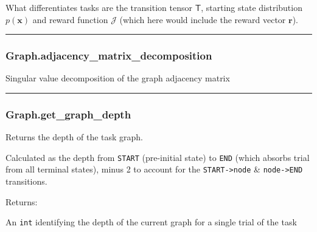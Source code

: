 What differentiates tasks are the transition tensor \(\mathsf T\),
starting state distribution \(p(\mathbf x)\) and reward function
\(\mathcal J\) (which here would include the reward vector
\(\mathbf r\)).

\begin{center}\rule{0.5\linewidth}{\linethickness}\end{center}

\hypertarget{graph.adjacency_matrix_decomposition}{%
\subsubsection{Graph.adjacency\_matrix\_decomposition}\label{graph.adjacency_matrix_decomposition}}

\begin{Shaded}
\begin{Highlighting}[]
\NormalTok{)}
\end{Highlighting}
\end{Shaded}

Singular value decomposition of the graph adjacency matrix

\begin{center}\rule{0.5\linewidth}{\linethickness}\end{center}

\hypertarget{graph.get_graph_depth}{%
\subsubsection{Graph.get\_graph\_depth}\label{graph.get_graph_depth}}

\begin{Shaded}
\begin{Highlighting}[]
\NormalTok{)}
\end{Highlighting}
\end{Shaded}

Returns the depth of the task graph.

Calculated as the depth from \texttt{START} (pre-initial state) to
\texttt{END} (which absorbs trial from all terminal states), minus 2 to
account for the \texttt{START-\textgreater{}node} \&
\texttt{node-\textgreater{}END} transitions.

Returns:

An \texttt{int} identifying the depth of the current graph for a single
trial of the task

